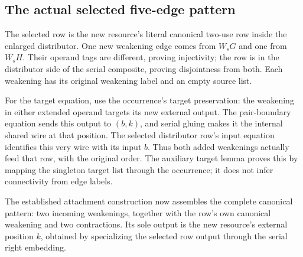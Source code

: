 \subsection{The actual selected five-edge pattern}
The selected row is the new resource's literal canonical two-use row inside
the enlarged distributor. One new weakening edge comes from $W_sG$ and
one from $W_sH$. Their operand tags are different, proving injectivity;
the row is in the distributor side of the serial composite, proving
disjointness from both. Each weakening has its original weakening label
and an empty source list.

For the target equation, use the occurrence's target preservation: the
weakening in either extended operand targets its new external output.
The pair-boundary equation sends this output to $(b,k)$, and serial gluing
makes it the internal shared wire at that position. The selected distributor
row's input equation identifies this very wire with its input $b$. Thus
both added weakenings actually feed that row, with the original order.
The auxiliary target lemma proves this by mapping the singleton target
list through the occurrence; it does not infer connectivity from edge labels.

The established attachment construction now assembles the complete canonical
pattern: two incoming weakenings, together with the row's own canonical
weakening and two contractions. Its sole output is the new resource's
external position $k$, obtained by specializing the selected row output
through the serial right embedding.

